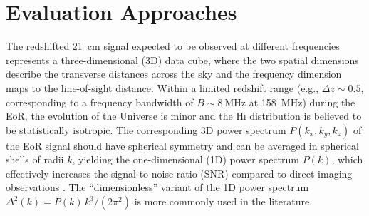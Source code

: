 \documentclass[modern]{aastex62}
\newcommand{\Hi}{H\textsc{i}}
\begin{document}
\section{Evaluation Approaches}
\label{sec:approaches}

The redshifted 21~cm signal expected to be observed at different
frequencies represents a three-dimensional (3D) data cube, where the
two spatial dimensions describe the transverse distances across the sky
and the frequency dimension maps to the line-of-sight distance.
{\color{cyan}%
Within a limited redshift range (e.g., $\Delta z \sim 0.5$, corresponding
to a frequency bandwidth of $B \sim \SI{8}{\MHz}$ at \SI{158}{\MHz})
during the EoR, the evolution of the Universe is minor and the \Hi{}
distribution is believed to be statistically isotropic.}
The corresponding 3D power spectrum $P(k_x, k_y, k_z)$ of the EoR signal
should have spherical symmetry and can be averaged in spherical shells
of radii $k$, yielding the one-dimensional (1D) power spectrum $P(k)$,
which effectively increases the signal-to-noise ratio (SNR) compared to
direct imaging observations \citep{morales2004,morales2006,datta2010}.
The \enquote{dimensionless} variant of the 1D power spectrum
$\Delta^2(k) = P(k) \,k^3 / (2\pi^2)$
is more commonly used in the literature.
\end{document}
